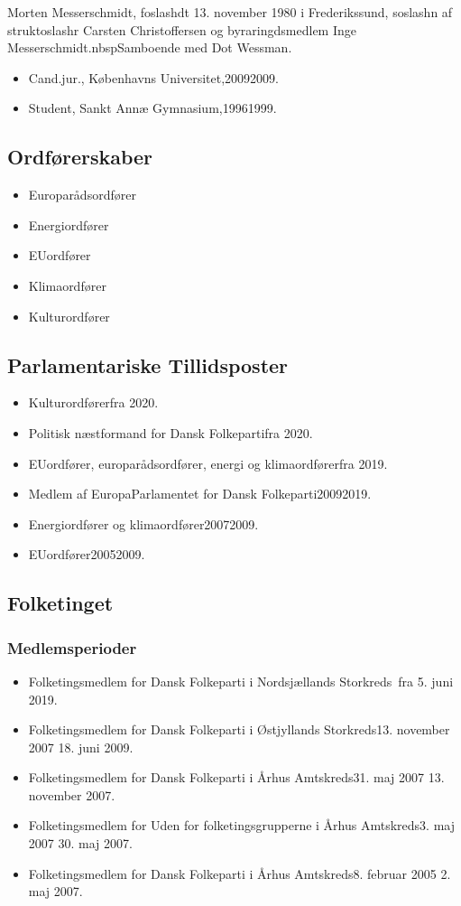 \documentclass[11pt, a4paper]{awesome-cv}
\begin{document}
\makecvheader[R]
\makelettertitle
\begin{cvletter}
Morten Messerschmidt, foslashdt 13. november 1980 i Frederikssund, soslashn af struktoslashr Carsten Christoffersen og byraringdsmedlem Inge Messerschmidt.nbspSamboende med Dot Wessman.

\begin{itemize}
\item Cand.jur., Københavns Universitet,20092009.
\item Student, Sankt Annæ Gymnasium,19961999.
\end{itemize}
\subsection*{Ordførerskaber}
\begin{itemize}
\item Europarådsordfører
\item Energiordfører
\item EUordfører
\item Klimaordfører
\item Kulturordfører
\end{itemize}
\subsection*{Parlamentariske Tillidsposter}
\begin{itemize}
\item Kulturordførerfra 2020.
\item Politisk næstformand for Dansk Folkepartifra 2020.
\item EUordfører, europarådsordfører, energi og klimaordførerfra 2019.
\item Medlem af EuropaParlamentet for Dansk Folkeparti20092019.
\item Energiordfører og klimaordfører20072009.
\item EUordfører20052009.
\end{itemize}
\subsection*{Folketinget}
\subsubsection*{Medlemsperioder}
\begin{itemize}
\item Folketingsmedlem for Dansk Folkeparti i Nordsjællands Storkreds fra 5. juni 2019.
\item Folketingsmedlem for Dansk Folkeparti i Østjyllands Storkreds13. november 2007  18. juni 2009.
\item Folketingsmedlem for Dansk Folkeparti i Århus Amtskreds31. maj 2007  13. november 2007.
\item Folketingsmedlem for Uden for folketingsgrupperne i Århus Amtskreds3. maj 2007  30. maj 2007.
\item Folketingsmedlem for Dansk Folkeparti i Århus Amtskreds8. februar 2005  2. maj 2007.
\end{itemize}

\end{cvletter}
\end{document}
